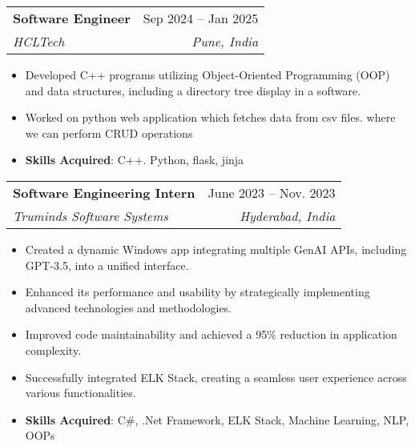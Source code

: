 \documentclass[letterpaper,11pt]{article}
\makeatletter
\newcommand{\resumeItem}[1]{
  \item\small{
    {#1 \vspace{-2pt}}
  }
}
\newcommand{\resumeSubheading}[4]{
  \vspace{-2pt}\item
    \begin{tabular*}{0.97\textwidth}[t]{l@{\extracolsep{\fill}}r}
      \textbf{#1} & #2 \\
      \textit{\small#3} & \textit{\small #4} \\
    \end{tabular*}\vspace{-7pt}
}
\newcommand{\resumeSubSubheading}[2]{
    \item
    \begin{tabular*}{0.97\textwidth}{l@{\extracolsep{\fill}}r}
      \textit{\small#1} & \textit{\small #2} \\
    \end{tabular*}\vspace{-7pt}
}
\newcommand{\resumeSubHeadingListEnd}{\end{itemize}}
\newcommand{\resumeItemListStart}{\begin{itemize}}
\newcommand{\resumeItemListEnd}{\end{itemize}\vspace{-5pt}}
\makeatother
\begin{document}
    \resumeSubheading
      {Software Engineer}{Sep 2024 -- Jan 2025}
      {HCLTech}{Pune, India}
      \resumeItemListStart
        \resumeItem{Developed C++ programs utilizing Object-Oriented Programming (OOP) and data structures, including a directory tree display in a software.}
        \resumeItem{Worked on python web application which fetches data from csv files. where we can perform CRUD operations}
        \resumeItem{\textbf{Skills Acquired}: C++. Python, flask, jinja}
      \resumeItemListEnd
  
    \resumeSubheading
      {Software Engineering Intern}{June 2023 -- Nov. 2023}
      {Truminds Software Systems}{Hyderabad, India}
      \resumeItemListStart
        \resumeItem{Created a dynamic Windows app integrating multiple GenAI APIs, including GPT-3.5, into a unified interface.}
        \resumeItem{Enhanced its performance and usability by strategically implementing advanced technologies and methodologies.}
        \resumeItem{Improved code maintainability and achieved a 95\% reduction in application complexity.}
        \resumeItem{Successfully integrated ELK Stack, creating a seamless user experience across various functionalities.}
        \resumeItem{\textbf{Skills Acquired}: C\#, .Net Framework, ELK Stack, Machine Learning, NLP, OOPs}
    \resumeItemListEnd


      


\end{document}
